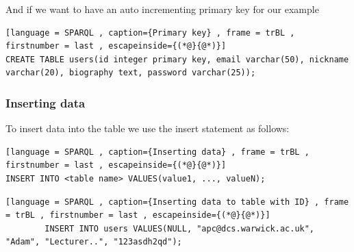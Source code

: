 \documentclass[a4paper]{article}
\theoremstyle{plain}
\theoremstyle{definition}
\newtheorem{exmp}{Example}[section]
\theoremstyle{remark}
\begin{document}
\begin{flushleft}
\begin{tcolorbox}[colback=black!3!white,colframe=black!60!white,title=\begin{exmp}Creating users table \label{Creating users table}\end{exmp}]
And if we want to have an auto incrementing primary key for our example
\begin{lstlisting}[language = SPARQL , caption={Primary key} , frame = trBL , firstnumber = last , escapeinside={(*@}{@*)}]
CREATE TABLE users(id integer primary key, email varchar(50), nickname varchar(20), biography text, password varchar(25));
\end{lstlisting}
\end{tcolorbox}
\subsubsection{Inserting data}
To insert data into the table we use the insert statement as follows:
\begin{lstlisting}[language = SPARQL , caption={Inserting data} , frame = trBL , firstnumber = last , escapeinside={(*@}{@*)}]
INSERT INTO <table name> VALUES(value1, ..., valueN);

\end{lstlisting}
\begin{tcolorbox}[colback=black!3!white,colframe=black!60!white,title=\begin{exmp}Inserting data to table with ID \label{Inserting data to table with ID}\end{exmp}]
        \begin{lstlisting}[language = SPARQL , caption={Inserting data to table with ID} , frame = trBL , firstnumber = last , escapeinside={(*@}{@*)}]
        INSERT INTO users VALUES(NULL, "apc@dcs.warwick.ac.uk", "Adam", "Lecturer..", "123asdh2qd");
        \end{lstlisting}
\end{tcolorbox}

\end{flushleft}
\end{document}
